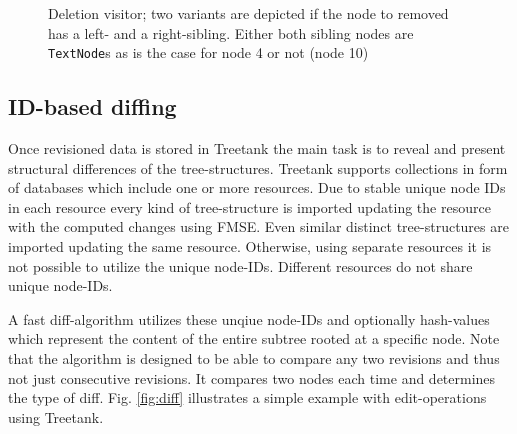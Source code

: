 \begin{figure}[tb]
\caption{\label{fig:deletionvisitor} Deletion visitor; two variants are depicted if the node to removed has a left- and a right-sibling. Either both sibling nodes are \texttt{TextNode}s as is the case for node 4 or not (node 10)}
\end{figure} 

\subsection{ID-based diffing}
Once revisioned data is stored in Treetank the main task is to reveal and present structural differences of the tree-structures. Treetank supports collections in form of databases which include one or more resources. Due to stable unique node IDs in each resource every kind of tree-structure is imported updating the resource with the computed changes using FMSE. Even similar distinct tree-structures are imported updating the same resource. Otherwise, using separate resources it is not possible to utilize the unique node-IDs. Different resources do not share unique node-IDs. 

A fast diff-algorithm utilizes these unqiue node-IDs and optionally hash-values which represent the content of the entire subtree rooted at a specific node. Note that the algorithm is designed to be able to compare any two revisions and thus not just consecutive revisions. It compares two nodes each time and determines the type of diff. Fig. \ref{fig:diff} illustrates a simple example with edit-operations using Treetank.

